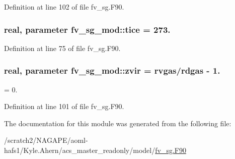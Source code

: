 Definition at line 102 of file fv\-\_\-sg.\-F90.

\subsubsection[{tice}]{\setlength{\rightskip}{0pt plus 5cm}real, parameter fv\-\_\-sg\-\_\-mod\-::tice = 273.\hspace{0.3cm}{\ttfamily [private]}}\label{classfv__sg__mod_a87874cc5d80d9ea6ee4f67ae591ef080}


Definition at line 75 of file fv\-\_\-sg.\-F90.

\subsubsection[{zvir}]{\setlength{\rightskip}{0pt plus 5cm}real, parameter fv\-\_\-sg\-\_\-mod\-::zvir = rvgas/rdgas -\/ 1.\hspace{0.3cm}{\ttfamily [private]}}\label{classfv__sg__mod_a4d8e998e436b110102a6723af127d4df}


= 0. 



Definition at line 101 of file fv\-\_\-sg.\-F90.



The documentation for this module was generated from the following file\-:\begin{DoxyCompactItemize}
\item 
/scratch2/\-N\-A\-G\-A\-P\-E/aoml-\/hafs1/\-Kyle.\-Ahern/acs\-\_\-master\-\_\-readonly/model/\hyperlink{fv__sg_8F90}{fv\-\_\-sg.\-F90}\end{DoxyCompactItemize}
